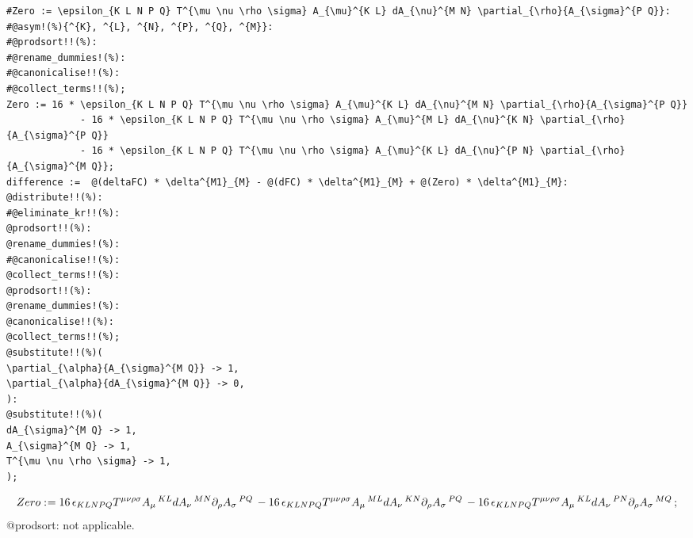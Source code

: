 \documentclass[11pt]{article}
\def\specialcolon{\mathrel{\mathop{:}}\hspace{-.5em}}
\begin{document}
{\color[named]{Blue}\begin{verbatim}
#Zero := \epsilon_{K L N P Q} T^{\mu \nu \rho \sigma} A_{\mu}^{K L} dA_{\nu}^{M N} \partial_{\rho}{A_{\sigma}^{P Q}}:
#@asym!(%){^{K}, ^{L}, ^{N}, ^{P}, ^{Q}, ^{M}}:
#@prodsort!!(%):
#@rename_dummies!(%):
#@canonicalise!!(%):
#@collect_terms!!(%);
Zero := 16 * \epsilon_{K L N P Q} T^{\mu \nu \rho \sigma} A_{\mu}^{K L} dA_{\nu}^{M N} \partial_{\rho}{A_{\sigma}^{P Q}}
             - 16 * \epsilon_{K L N P Q} T^{\mu \nu \rho \sigma} A_{\mu}^{M L} dA_{\nu}^{K N} \partial_{\rho}{A_{\sigma}^{P Q}}
             - 16 * \epsilon_{K L N P Q} T^{\mu \nu \rho \sigma} A_{\mu}^{K L} dA_{\nu}^{P N} \partial_{\rho}{A_{\sigma}^{M Q}};
difference :=  @(deltaFC) * \delta^{M1}_{M} - @(dFC) * \delta^{M1}_{M} + @(Zero) * \delta^{M1}_{M}:
@distribute!!(%):
#@eliminate_kr!!(%):
@prodsort!!(%):
@rename_dummies!(%):
#@canonicalise!!(%):
@collect_terms!!(%):
@prodsort!!(%):
@rename_dummies!(%):
@canonicalise!!(%):
@collect_terms!!(%);
@substitute!!(%)(
\partial_{\alpha}{A_{\sigma}^{M Q}} -> 1,
\partial_{\alpha}{dA_{\sigma}^{M Q}} -> 0,
):
@substitute!!(%)(
dA_{\sigma}^{M Q} -> 1,
A_{\sigma}^{M Q} -> 1,
T^{\mu \nu \rho \sigma} -> 1,
);
\end{verbatim}}
\begin{dmath*}[compact, spread=2pt]
Zero\specialcolon{}= 16\, {\epsilon}_{K L N P Q} {T}^{\mu \nu \rho \sigma} {A}_{\mu}\,^{K L} {dA}_{\nu}\,^{M N} {\partial}_{\rho}{{A}_{\sigma}\,^{P Q}}\,  - 16\, {\epsilon}_{K L N P Q} {T}^{\mu \nu \rho \sigma} {A}_{\mu}\,^{M L} {dA}_{\nu}\,^{K N} {\partial}_{\rho}{{A}_{\sigma}\,^{P Q}}\,  - 16\, {\epsilon}_{K L N P Q} {T}^{\mu \nu \rho \sigma} {A}_{\mu}\,^{K L} {dA}_{\nu}\,^{P N} {\partial}_{\rho}{{A}_{\sigma}\,^{M Q}}\, ;
\end{dmath*}
@prodsort: not applicable.
\end{document}
